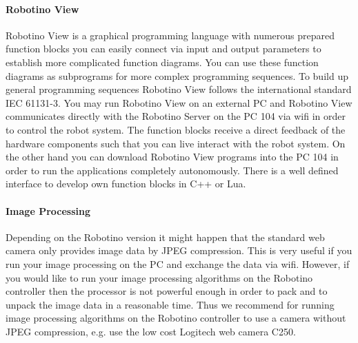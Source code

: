 \documentclass[12pt,twoside]{article}
\begin{document}
\begin{appendix}
\paragraph{Robotino View} 

Robotino View is a graphical programming language with numerous
prepared function blocks you can easily connect via input and output
parameters to establish more complicated function diagrams. You can use
these function diagrams as subprograms for more complex programming
sequences. To build up general programming sequences Robotino View
follows the international standard IEC 61131-3. You may run Robotino
View on an external PC and Robotino View communicates directly with
the Robotino Server on the PC 104 via wifi in order to control the
robot system. The function blocks receive a direct feedback of the
hardware components such that you can live interact with the robot
system. On the other hand you can download Robotino View programs into
the PC 104 in order to run the applications completely autonomously.
There is a well defined interface to develop own function blocks in C++
or Lua.

\paragraph{Image Processing}

Depending on the Robotino version it might happen that the standard web
camera only provides image data by JPEG compression. This is very
useful if you run your image processing on the PC and exchange the data
via wifi. However, if you would like to run your image processing
algorithms on the Robotino controller then the processor is not
powerful enough in order to pack and to unpack the image data in a
reasonable time. Thus we recommend for running image processing
algorithms on the Robotino controller to use a camera without JPEG
compression, e.g. use the low cost Logitech web camera C250.


\end{appendix}
\end{document}
